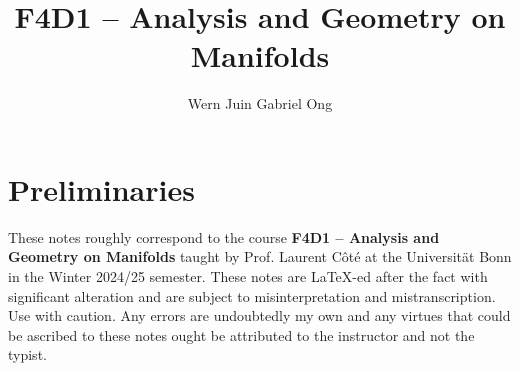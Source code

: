 \documentclass{amsart}
\theoremstyle{definition}
\numberwithin{equation}{section}
\begin{document}
\large
\title[Analysis and Geometry on Manifolds]{F4D1 -- Analysis and Geometry on Manifolds}
\author{Wern Juin Gabriel Ong}
\address{Universit\"{a}t Bonn, Bonn, D-53111}
\maketitle
\section*{Preliminaries}
These notes roughly correspond to the course \textbf{F4D1 -- Analysis and Geometry on Manifolds} taught by Prof. Laurent C\^{o}t\'{e} at the Universit\"{a}t Bonn in the Winter 2024/25 semester. These notes are \LaTeX-ed after the fact with significant alteration and are subject to misinterpretation and mistranscription. Use with caution. Any errors are undoubtedly my own and any virtues that could be ascribed to these notes ought be attributed to the instructor and not the typist.  
\tableofcontents

\newpage
\printbibliography
\end{document}
